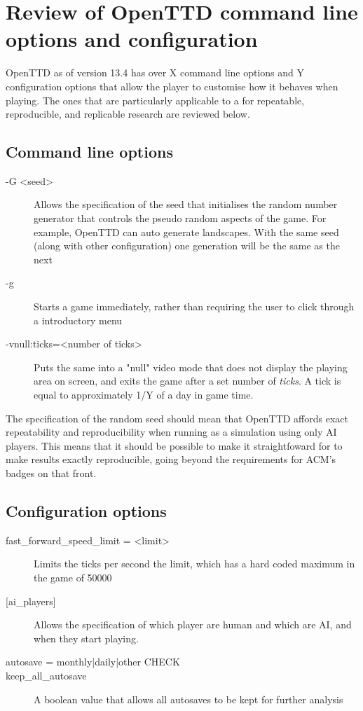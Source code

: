 \documentclass[logo,msc]{infthesis}           %
\begin{document}
\section{Review of OpenTTD command line options and configuration}
OpenTTD as of version 13.4 has over X command line options and Y configuration options that allow the player to customise how it behaves when playing. The ones that are particularly applicable to a  for repeatable, reproducible, and replicable research are reviewed below.

\subsection{Command line options}

\begin{description}
\item[-G \textless seed\textgreater] Allows the specification of the seed that initialises the random number generator that controls the pseudo random aspects of the game. For example, OpenTTD can auto generate landscapes. With the same seed (along with other configuration) one generation will be the same as the next
\item[-g] Starts a game immediately, rather than requiring the user to click through a introductory menu 
\item[-vnull:ticks=\textless number of ticks\textgreater] Puts the same into a "null" video mode that does not display the playing area on screen, and exits the game after a set number of \emph{ticks}. A tick is equal to approximately 1/Y of a day in game time.
\end{description}

The specification of the random seed should mean that OpenTTD affords exact repeatability and reproducibility when running as a simulation using only AI players. This means that it should be possible to make it straightfoward for to make results exactly reproducible, going beyond the requirements for ACM's badges on that front.

\subsection{Configuration options}

\begin{description}
\item[{fast\_forward\_speed\_limit} = \textless limit\textgreater] Limits the ticks per second the limit, which has a hard coded maximum in the game of 50000

\item[{[ai\_players]}] Allows the specification of which player are human and which are AI, and when they start playing.

\item[autosave = monthly|daily|other CHECK]

\item[keep\_all\_autosave]  A boolean value that allows all autosaves to be kept for further analysis
\end{description}
\end{document}
